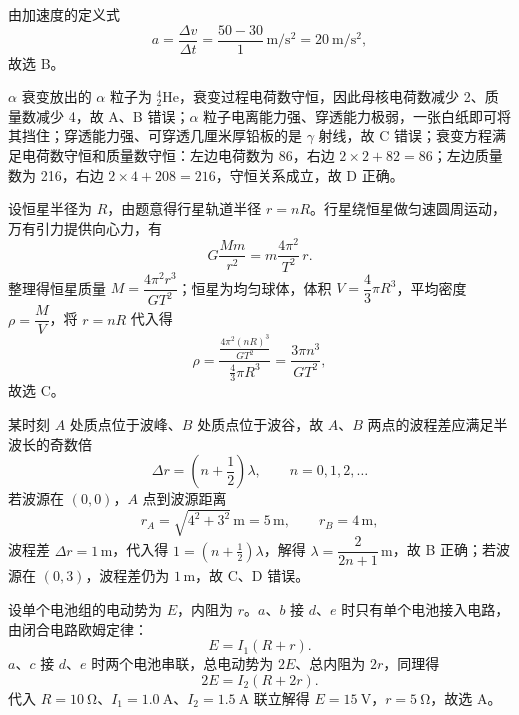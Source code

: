 
\begin{answer}
由加速度的定义式
\[
  a=\frac{\Delta v}{\Delta t}=\frac{50-30}{1}\,\si{\metre\per\second\squared}
   =\SI{20}{\metre\per\second\squared},
\]
故选 B。
\end{answer}

\begin{answer}
$\alpha$ 衰变放出的 $\alpha$ 粒子为 ${}_{2}^{4}\mathrm{He}$，衰变过程电荷数守恒，因此母核电荷数减少 2、质量数减少 4，故 A、B 错误；$\alpha$ 粒子电离能力强、穿透能力极弱，一张白纸即可将其挡住；穿透能力强、可穿透几厘米厚铅板的是 $\gamma$ 射线，故 C 错误；衰变方程满足电荷数守恒和质量数守恒：左边电荷数为 86，右边 $2\times2+82=86$；左边质量数为 216，右边 $2\times4+208=216$，守恒关系成立，故 D 正确。
\end{answer}

\begin{answer}
设恒星半径为 $R$，由题意得行星轨道半径 $r=nR$。行星绕恒星做匀速圆周运动，万有引力提供向心力，有
\[
  G\frac{Mm}{r^{2}}=m\frac{4\pi^{2}}{T^{2}}\,r .
\]
整理得恒星质量 $M=\dfrac{4\pi^{2}r^{3}}{GT^{2}}$；恒星为均匀球体，体积 $V=\dfrac{4}{3}\pi R^{3}$，平均密度 $\rho=\dfrac{M}{V}$，将 $r=nR$ 代入得
\[
  \rho=\frac{\frac{4\pi^{2}(nR)^{3}}{GT^{2}}}{\frac{4}{3}\pi R^{3}}
      =\frac{3\pi n^{3}}{GT^{2}},
\]
故选 C。
\end{answer}

\begin{answer}
某时刻 $A$ 处质点位于波峰、$B$ 处质点位于波谷，故 $A$、$B$ 两点的波程差应满足半波长的奇数倍
\[
  \Delta r=\left(n+\frac{1}{2}\right)\lambda,\qquad n=0,1,2,\dots
\]
若波源在 $(0,0)$，$A$ 点到波源距离
\[
  r_{A}=\sqrt{4^{2}+3^{2}}\,\si{\metre}=5\,\si{\metre},\qquad r_{B}=4\,\si{\metre},
\]
波程差 $\Delta r=1\,\si{\metre}$，代入得 $1=\left(n+\tfrac{1}{2}\right)\lambda$，解得 $\lambda=\dfrac{2}{2n+1}\,\si{\metre}$，故 B 正确；若波源在 $(0,3)$，波程差仍为 $1\,\si{\metre}$，故 C、D 错误。
\end{answer}

\begin{answer}
设单个电池组的电动势为 $E$，内阻为 $r$。$a$、$b$ 接 $d$、$e$ 时只有单个电池接入电路，由闭合电路欧姆定律：
\[
  E=I_{1}(R+r).
\]
$a$、$c$ 接 $d$、$e$ 时两个电池串联，总电动势为 $2E$、总内阻为 $2r$，同理得
\[
  2E=I_{2}(R+2r).
\]
代入 $R=\SI{10}{\ohm}$、$I_{1}=\SI{1.0}{\ampere}$、$I_{2}=\SI{1.5}{\ampere}$ 联立解得 $E=\SI{15}{\volt}$，$r=\SI{5}{\ohm}$，故选 A。
\end{answer}

